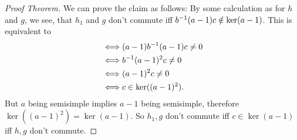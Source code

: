 \begin{proof}[Proof Theorem]
We can prove the claim as follows: By some calculation as for $h$ and $g$, we see, that $h_1$ and $g$ don't commute iff $b^{-1}(a-1)c \notin \ker(a-1)$. This is equivalent to
\begin{align*}
\iff & (a-1)b^{-1}(a-1)c \neq 0\\
\iff & b^{-1}(a-1)^2c \neq 0\\
\iff & (a-1)^2c \neq 0\\
\iff & c \in \ker((a-1)^2).
\end{align*}
But $a$ being semisimple implies $a-1$ being semisimple, therefore $\ker((a-1)^2) = \ker(a-1)$. So $h_1,g$ don't commute iff $c \in \ker(a-1) $ iff $h,g$ don't commute.
\end{proof}